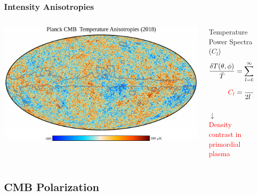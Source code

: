 \documentclass[10pt,aspectratio=169]{beamer}
\begin{document}
\begin{frame}
\frametitle{Intensity Anisotropies}

\begin{columns}
        \begin{column}{0.65\textwidth}
                \centering
                \includegraphics[width=1\textwidth]{Planck_2018_T_CMB_small}
        \end{column}
        \pause
        \begin{column}{0.33\textwidth}
        \scriptsize
                \begin{block}{Temperature Power Spectra ($C_l$)}
                        \scriptsize
                        \begin{align}
                                \frac{\var{T\qty(\theta,\phi)}}{\bar T} & =
                                \sum^\infty_{l=0}\sum^l_{m=-l} a_{l,m}
                                Y_{l,m}\qty(\theta,\phi) \\
                                \textcolor{red}{C_l} & = \frac{1}{2l + 1}
                                \sum_m \expval{a_{l,m} a^*_{l',m'}}
                        \end{align}
                \end{block}
                \pause
                \centering
                \Large $\downarrow$\\
                \normalsize
                \textcolor{red}{Density contrast in primordial plasma}
        \end{column}
\end{columns}

\end{frame}

\subsection{CMB Polarization}
\end{document}
